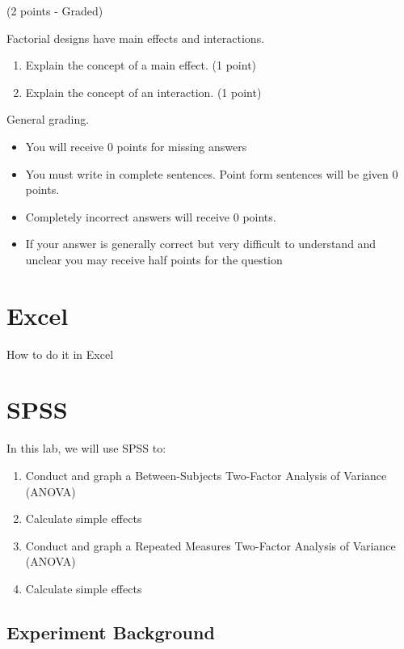 \documentclass[]{book}
\providecommand{\tightlist}{%
  \setlength{\itemsep}{0pt}\setlength{\parskip}{0pt}}
\begin{document}
(2 points - Graded)

Factorial designs have main effects and interactions.

\begin{enumerate}
\def\labelenumi{\arabic{enumi}.}
\item
  Explain the concept of a main effect. (1 point)
\item
  Explain the concept of an interaction. (1 point)
\end{enumerate}

General grading.

\begin{itemize}
\tightlist
\item
  You will receive 0 points for missing answers
\item
  You must write in complete sentences. Point form sentences will be
  given 0 points.
\item
  Completely incorrect answers will receive 0 points.
\item
  If your answer is generally correct but very difficult to understand
  and unclear you may receive half points for the question
\end{itemize}

\section{Excel}\label{excel-10}

How to do it in Excel

\section{SPSS}\label{spss-10}

In this lab, we will use SPSS to:

\begin{enumerate}
\def\labelenumi{\arabic{enumi}.}
\tightlist
\item
  Conduct and graph a Between-Subjects Two-Factor Analysis of Variance
  (ANOVA)
\item
  Calculate simple effects
\item
  Conduct and graph a Repeated Measures Two-Factor Analysis of Variance
  (ANOVA)
\item
  Calculate simple effects
\end{enumerate}

\subsection{Experiment Background}\label{experiment-background-5}
\end{document}
